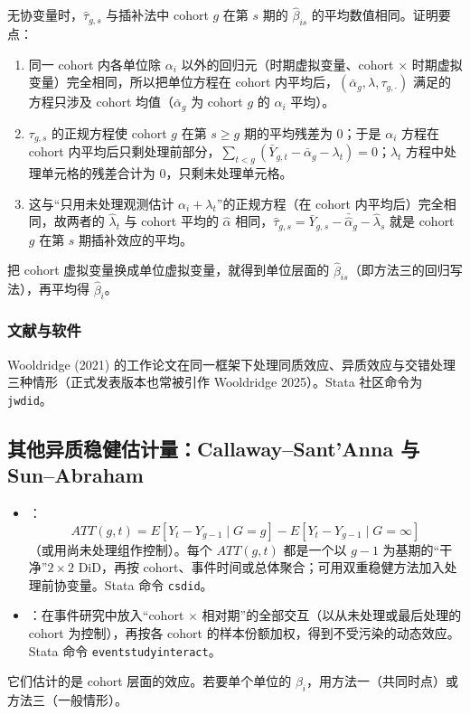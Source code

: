 无协变量时，$\hat\tau_{g,s}$ 与插补法中 cohort $g$ 在第 $s$ 期的 $\hat\beta_{is}$ 的平均数值相同。证明要点：
\begin{enumerate}
  \item 同一 cohort 内各单位除 $\alpha_i$ 以外的回归元（时期虚拟变量、cohort $\times$ 时期虚拟变量）完全相同，所以把单位方程在 cohort 内平均后，$(\bar\alpha_g,\lambda,\tau_{g,\cdot})$ 满足的方程只涉及 cohort 均值（$\bar\alpha_g$ 为 cohort $g$ 的 $\alpha_i$ 平均）。
  \item $\tau_{g,s}$ 的正规方程使 cohort $g$ 在第 $s\ge g$ 期的平均残差为 0；于是 $\alpha_i$ 方程在 cohort 内平均后只剩处理前部分，$\sum_{t<g}(\bar Y_{g,t}-\bar\alpha_g-\lambda_t)=0$；$\lambda_t$ 方程中处理单元格的残差合计为 0，只剩未处理单元格。
  \item 这与“只用未处理观测估计 $\alpha_i+\lambda_t$”的正规方程（在 cohort 内平均后）完全相同，故两者的 $\hat\lambda_t$ 与 cohort 平均的 $\hat\alpha$ 相同，$\hat\tau_{g,s}=\bar Y_{g,s}-\bar{\hat\alpha}_g-\hat\lambda_s$ 就是 cohort $g$ 在第 $s$ 期插补效应的平均。
\end{enumerate}
把 cohort 虚拟变量换成单位虚拟变量，就得到单位层面的 $\hat\beta_{is}$（即方法三的回归写法），再平均得 $\hat\beta_i$。

\subsubsection{文献与软件}

Wooldridge (2021) 的工作论文在同一框架下处理同质效应、异质效应与交错处理三种情形（正式发表版本也常被引作 Wooldridge 2025）。Stata 社区命令为 \texttt{jwdid}。

\subsection{其他异质稳健估计量：Callaway--Sant'Anna 与 Sun--Abraham}

\begin{itemize}
  \item {}：
  \[
  ATT(g,t)=E[Y_t-Y_{g-1}\mid G=g]-E[Y_t-Y_{g-1}\mid G=\infty]
  \]
  （或用尚未处理组作控制）。每个 $ATT(g,t)$ 都是一个以 $g-1$ 为基期的“干净”$2\times2$ DiD，再按 cohort、事件时间或总体聚合；可用双重稳健方法加入处理前协变量。Stata 命令 \texttt{csdid}。
  \item {}：在事件研究中放入“cohort $\times$ 相对期”的全部交互（以从未处理或最后处理的 cohort 为控制），再按各 cohort 的样本份额加权，得到不受污染的动态效应。Stata 命令 \texttt{eventstudyinteract}。
\end{itemize}
它们估计的是 cohort 层面的效应。若要单个单位的 $\beta_i$，用方法一（共同时点）或方法三（一般情形）。

